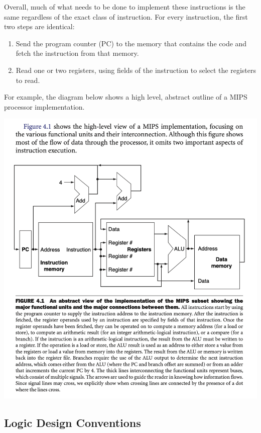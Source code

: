 \documentclass[10pt,a4paper]{article}
\begin{document}
Overall, much of what needs to be done to implement these instructions is the same regardless of the exact class of instruction. For every instruction, the first two steps are identical:
\begin{enumerate}
    \item Send the program counter (PC) to the memory that contains the code and fetch the instruction from that memory.
    \item Read one or two registers, using fields of the instruction to select the registers to read. 
\end{enumerate}
For example, the diagram below shows a high level, abstract outline of a MIPS processor implementation.
\begin{center}
    \includegraphics[scale=0.45]{images/mips_processor_high_level.png}
\end{center}

\subsection{Logic Design Conventions}
\end{document}
